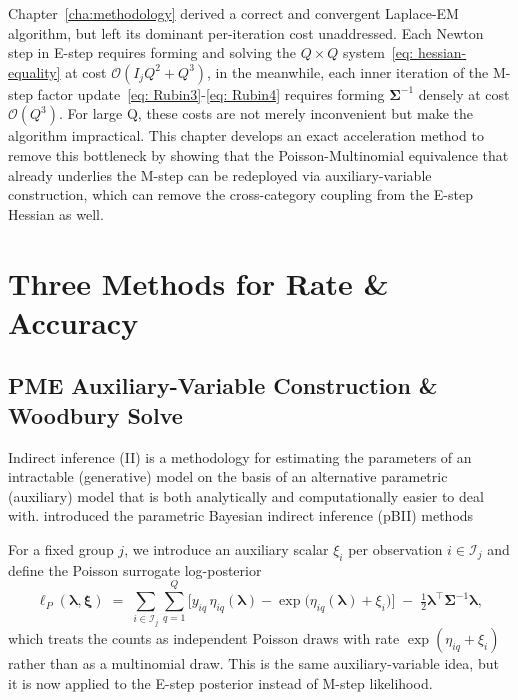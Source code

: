 Chapter~\ref{cha:methodology} derived a correct and convergent Laplace-EM algorithm, but left its dominant per-iteration cost unaddressed. Each Newton step in E-step requires forming and solving the $Q\times Q$ system~\eqref{eq: hessian-equality} at cost $\mathcal{O}(I_{j}Q^{2}+Q^{3})$, in the meanwhile, each inner iteration of the M-step factor update~\eqref{eq: Rubin3}-\eqref{eq: Rubin4} requires forming $\bm{\Sigma}^{-1}$ densely at cost $\mathcal{O}(Q^{3})$. For large Q, these costs are not merely inconvenient but make the algorithm impractical. This chapter develops an exact acceleration method to remove this bottleneck by showing that the Poisson-Multinomial equivalence that already underlies the M-step can be redeployed via auxiliary-variable construction, which can remove the cross-category coupling from the E-step Hessian as well. 

\section{Three Methods for Rate \& Accuracy}

\subsection{PME Auxiliary-Variable Construction \& Woodbury Solve}
\label{subsec:auxiliary-variable-construction}

Indirect inference (II) is a methodology for estimating the parameters of an intractable (generative) model on the basis of an alternative parametric (auxiliary) model that is both analytically and computationally easier to deal with. \citet{Drovandi2015} introduced the parametric Bayesian indirect inference (pBII) methods 

For a fixed group $j$, we introduce an auxiliary scalar $\xi_{i}$ per observation $i\in \mathcal{I}_{j}$ and define the Poisson surrogate log-posterior
\begin{equation}
    \ell_P(\boldsymbol{\lambda}, \boldsymbol{\xi}) \;=\; \sum_{i \in \mathcal{I}_j} \sum_{q=1}^{Q} \Big[ y_{iq}\, \eta_{iq}(\boldsymbol{\lambda}) - \exp\big(\eta_{iq}(\boldsymbol{\lambda}) + \xi_i\big) \Big] \;-\; \tfrac{1}{2} \boldsymbol{\lambda}^\top \boldsymbol{\Sigma}^{-1} \boldsymbol{\lambda},
\end{equation}
which treats the counts as independent Poisson draws with rate $\exp{(\eta_{iq}+\xi_{i})}$ rather than as a multinomial draw. This is the same auxiliary-variable idea, but it is now applied to the E-step posterior instead of M-step likelihood.


